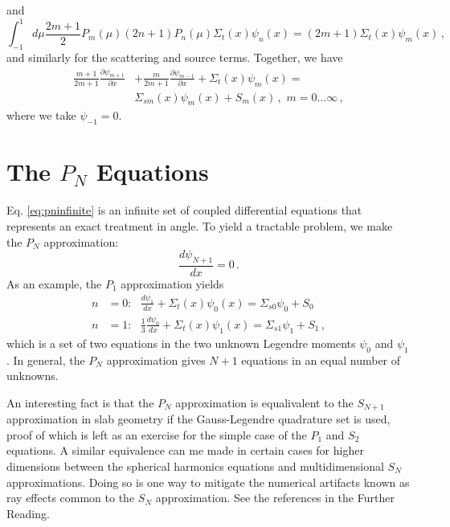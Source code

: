 and
\begin{equation}
 \int^{1}_{-1} d\mu \frac{2m+1}{2}P_m(\mu) (2n+1)P_n(\mu) \Sigma_t(x)\psi_n(x)  = (2m+1) \Sigma_t(x) \psi_m(x) \, ,
\end{equation}
and similarly for the scattering and source terms.  Together, we have
\begin{equation}
\begin{split}
 \frac{m+1}{2m+1}\frac{\partial \psi_{m+1}}{\partial x} &+ \frac{m}{2m+1}\frac{\partial \psi_{m-1}}{\partial x} +  \Sigma_t(x) \psi_m(x) = \\
  & \Sigma_{sm}(x) \psi_m(x) + S_m(x) \, , \, \, m = 0 \ldots \infty \, ,
\end{split}
\label{eq:pninfinite}
\end{equation}
where we take $\psi_{-1} = 0$.

\section*{The $P_N$ Equations}

Eq. \ref{eq:pninfinite} is an infinite set of coupled differential equations that represents an exact treatment in angle.  To yield a tractable problem, we make the $P_N$ approximation:
\begin{equation}
 \frac{d\psi_{N+1}}{dx} = 0 \, .
 \label{eq:pnapprox}
\end{equation}
As an example, the $P_1$ approximation yields
\begin{equation}
 \begin{split}
  n &= 0: \, \, \, \, \frac{d\psi_1}{dx} + \Sigma_t(x)\psi_0 (x) = \Sigma_{s0}\psi_0 + S_0 \\
  n &= 1: \, \, \, \, \frac{1}{3}\frac{d\psi_0}{dx} + \Sigma_t(x)\psi_1 (x) = \Sigma_{s1}\psi_1 + S_1 \, ,
 \end{split}
 \label{eq:p1approx}
\end{equation}
which is a set of two equations in the two unknown Legendre moments $\psi_0$ and $\psi_1$.  In general, the $P_N$ approximation gives $N+1$ equations in an equal number of unknowns.

An interesting fact is that the $P_N$ approximation is equalivalent to the $S_{N+1}$ approximation in slab geometry if the Gauss-Legendre quadrature set is used, proof of which is left as an exercise for the simple case of the $P_1$ and $S_2$ equations.  A similar equivalence can me made in certain cases for higher dimensions between the spherical harmonics equations and multidimensional $S_N$ approximations.  Doing so is one way to mitigate the numerical artifacts known as ray effects common to the $S_N$ approximation.  See the references in the Further Reading.

